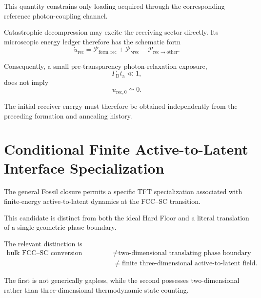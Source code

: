 This quantity constrains only loading acquired through the corresponding
reference photon-coupling channel.

Catastrophic decompression may excite the receiving sector directly. Its
microscopic energy ledger therefore has the schematic form
\begin{equation}
    \dot u_{\mathrm{rec}}
    =
    \mathcal P_{\mathrm{form,rec}}
    +
    \mathcal P_{\gamma\mathrm{rec}}
    -
    \mathcal P_{\mathrm{rec}\rightarrow\mathrm{other}}.
    \label{eq:AT_receiver_loading_ledger}
\end{equation}

Consequently, a small pre-transparency photon-relaxation exposure,
\begin{equation}
    \Gamma_{\mathrm D}t_{\mathrm a}
    \ll
    1,
\end{equation}
does not imply
\begin{equation}
    u_{\mathrm{rec},0}
    \simeq
    0.
    \label{eq:AT_small_exposure_not_cold}
\end{equation}

The initial receiver energy must therefore be obtained independently from the
preceding formation and annealing history.


\section{Conditional Finite Active-to-Latent Interface Specialization}

The general Fossil closure permits a specific TFT specialization associated
with finite-energy active-to-latent dynamics at the FCC--SC transition.

This candidate is distinct from both the ideal Hard Floor and a literal
translation of a single geometric phase boundary.

The relevant distinction is
\begin{equation}
    \begin{aligned}
        \text{bulk FCC--SC conversion coordinate}
        &\neq
        \text{two-dimensional translating phase boundary}
        \\
        &\neq
        \text{finite three-dimensional active-to-latent field}.
    \end{aligned}
    \label{eq:AT_interface_three_way_distinction}
\end{equation}

The first is not generically gapless, while the second possesses
two-dimensional rather than three-dimensional thermodynamic state counting.

